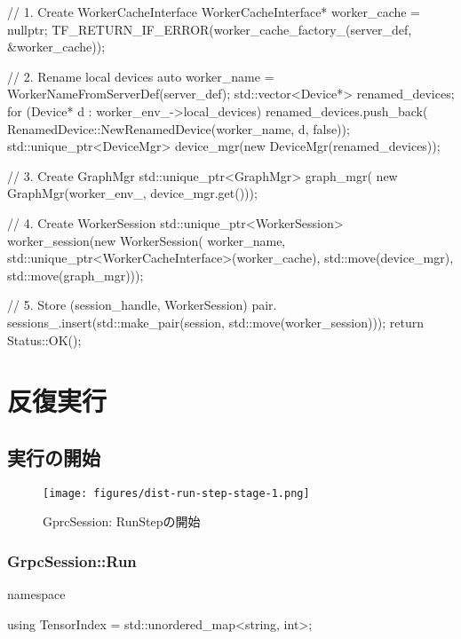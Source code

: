 \begin{content}
\begin{leftbar}
\begin{c++}
{  // 1. Create WorkerCacheInterface
  WorkerCacheInterface* worker_cache = nullptr;
  TF_RETURN_IF_ERROR(worker_cache_factory_(server_def, &worker_cache));

  // 2. Rename local devices  
  auto worker_name = WorkerNameFromServerDef(server_def);
  std::vector<Device*> renamed_devices;
  for (Device* d : worker_env_->local_devices) {
    renamed_devices.push_back(
        RenamedDevice::NewRenamedDevice(worker_name, d, false));
  }
  std::unique_ptr<DeviceMgr> device_mgr(new DeviceMgr(renamed_devices));

  // 3. Create GraphMgr
  std::unique_ptr<GraphMgr> graph_mgr(
      new GraphMgr(worker_env_, device_mgr.get()));
  
  // 4. Create WorkerSession
  std::unique_ptr<WorkerSession> worker_session(new WorkerSession(
      worker_name, std::unique_ptr<WorkerCacheInterface>(worker_cache),
      std::move(device_mgr), std::move(graph_mgr)));

  // 5. Store (session\_handle, WorkerSession) pair.
  sessions_.insert(std::make_pair(session, std::move(worker_session)));
  return Status::OK();
}
\end{c++}
\end{leftbar}

\section{反復実行}

\begin{content}

\subsection{実行の開始}

\begin{figure}[H]
\centering
\texttt{[image: figures/dist-run-step-stage-1.png]}
\caption{GprcSession: RunStepの開始}
 \label{fig:dist-run-step-stage-1}
\end{figure}

\subsubsection{GrpcSession::Run}

\begin{leftbar}
\begin{c++}
namespace {
  using TensorIndex = std::unordered_map<string, int>;

}
\end{c++}
\end{leftbar}
\end{content}
\end{content}
